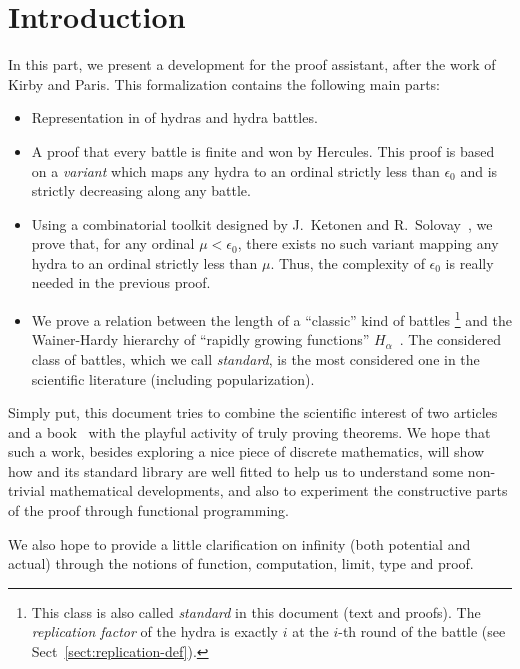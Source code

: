 \section*{Introduction}

In this part, we present a development  for the \coq{} proof assistant, after the work of Kirby and Paris. This formalization contains the following main parts:

\begin{itemize}
\item Representation in \coq{} of hydras and hydra battles.
\item A proof that every battle is finite and won by Hercules. This proof is based on a \emph{variant} which maps any hydra to an ordinal strictly less than $\epsilon_0$ and is strictly decreasing along any battle.

\item Using a combinatorial toolkit designed by J.~Ketonen and R.~Solovay~\cite{KS81}, we prove that, for any ordinal $\mu<\epsilon_0$, there exists no such variant mapping any hydra to an ordinal strictly less than $\mu$. Thus, the complexity of $\epsilon_0$ is really needed in the previous proof.

\item We prove a relation between the length of a ``classic''  kind of  battles \footnote{This class is also called \emph{standard} in this document (text and proofs). The \emph{replication factor} of the hydra is exactly $i$ at the $i$-th round of the battle (see Sect~\vref{sect:replication-def}).}
and the Wainer-Hardy hierarchy of ``rapidly growing functions'' $H_\alpha$~\cite{Wainer1970}. The considered class of battles, which we call \emph{standard},  is the most considered one in the scientific  literature (including popularization).
\end{itemize}


Simply put, this document tries to combine the scientific interest of two articles~\cite{KP82, KS81} and a book~\cite{schutte} with the playful activity of truly proving theorems.
We hope  that such a work, besides exploring a nice piece of discrete mathematics,
will show how \coq{} and its standard library are well fitted to help us to understand some non-trivial mathematical developments, and also to experiment the constructive parts of  the proof through functional programming.

 We also hope to provide a little clarification on infinity (both potential and actual) through the notions of function, computation, limit,
 type and proof.



